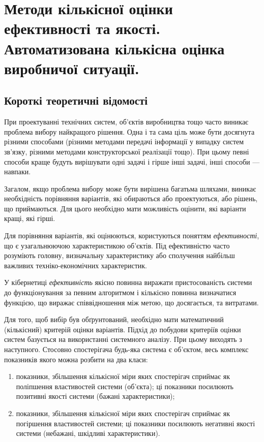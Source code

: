 \chapter{Методи кількісної оцінки ефективності та якості. Автоматизована кількісна оцінка виробничої
ситуації.}

\section{Короткі теоретичні відомості}

При проектуванні технічних систем, об’єктів виробництва тощо часто виникає проблема вибору
найкращого рішення. Одна і та сама ціль може бути досягнута різними способами (різними методами
передачі інформації у випадку систем зв’язку, різними методами конструкторської реалізації
тощо). При цьому певні способи краще будуть вирішувати одні задачі і гірше інші задачі, інші способи
--- навпаки.

Загалом, якщо проблема вибору може бути вирішена багатьма шляхами, виникає необхідність порівняння
варіантів, які обираються або проектуються, або рішень, що приймаються. Для цього необхідно мати
можливість оцінити, які варіанти кращі, які гірші.

Для порівняння варіантів, які оцінюються, користуються поняттям \textit{ефективності}, що є
узагальнюючою характеристикою об’єктів. Під ефективністю часто розуміють головну, визначальну
характеристику або сполучення найбільш важливих техніко-економічних характеристик.

У кібернетиці \textit{ефективність} якісно повинна виражати пристосованість системи до
функціонування за певним алгоритмом і кількісно повинна визначатися функцією, що виражає
співвідношення між метою, що досягається, та витратами.

Для того, щоб вибір був обґрунтований, необхідно мати математичний (кількісний) критерій оцінки
варіантів. Підхід до побудови критеріїв оцінки систем базується на використанні системного
аналізу. При цьому виходять з наступного. Стосовно спостерігача будь-яка система є об'єктом, весь
комплекс показників якого можна розбити на два класи:

\begin{enumerate}
\item показники, збільшення кількісної міри яких спостерігач сприймає як поліпшення властивостей
системи (об’єкта); ці показники посилюють позитивні якості системи (бажані характеристики);
\item показники, збільшення кількісної міри яких спостерігач сприймає як погіршення властивостей
системи; ці показники посилюють негативні якості системи (небажані, шкідливі характеристики).
\end{enumerate}
   
